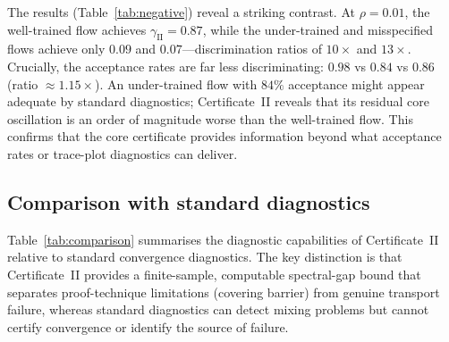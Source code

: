 \documentclass[12pt]{article}
\begin{document}
The results (Table~\ref{tab:negative}) reveal a striking contrast.
At $\rho = 0.01$, the well-trained flow achieves $\gamma_{\mathrm{II}} = 0.87$, while the under-trained and misspecified flows achieve only $0.09$ and $0.07$---discrimination ratios of $10\times$ and $13\times$.
Crucially, the acceptance rates are far less discriminating: $0.98$ vs $0.84$ vs $0.86$ (ratio $\approx 1.15\times$).
An under-trained flow with $84\%$ acceptance might appear adequate by standard diagnostics; Certificate~II reveals that its residual core oscillation is an order of magnitude worse than the well-trained flow.
This confirms that the core certificate provides information beyond what acceptance rates or trace-plot diagnostics can deliver.


\subsection{Comparison with standard diagnostics}\label{sec:comparison}

Table~\ref{tab:comparison} summarises the diagnostic capabilities of Certificate~II relative to standard convergence diagnostics. The key distinction is that Certificate~II provides a finite-sample, computable spectral-gap bound that separates proof-technique limitations (covering barrier) from genuine transport failure, whereas standard diagnostics can detect mixing problems but cannot certify convergence or identify the source of failure.
\end{document}
